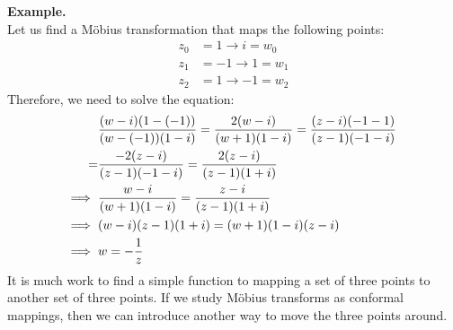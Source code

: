 \documentclass[11pt]{article}
\begin{document}
\textbf{Example.} \\
Let us find a Möbius transformation that maps the following points: 
\begin{align*}
z_0 &= 1 \to i = w_0 \\ 
z_1 &= -1 \to 1 = w_1 \\
z_2 &= 1 \to -1 = w_2 
\end{align*}
Therefore, we need to solve the equation:
\begin{align*}
&\frac{(w - i)(1 - (-1))}{(w - (-1))(1-i)} = \frac{2(w - i)}{(w + 1)(1 - i)} = \frac{(z - i)(-1-1)}{(z - 1)(-1 - i)} \\
= &\frac{-2(z - i)}{(z-1)(-1-i)} = \frac{2(z-i)}{(z-1)(1+i)}\\
\Longrightarrow \hspace{2mm}&\frac{w - i}{(w +1)(1 -i )} = \frac{z - i}{(z - 1)(1 + i)} \\
\Longrightarrow \hspace{2mm}&(w - i)(z - 1)(1 + i) = (w + 1)(1 - i)(z - i) \\
\Longrightarrow \hspace{2mm}&w = -\frac{1}{z}
\end{align*}
It is much work to find a simple function to mapping a set of three points to another set of three points. If we study Möbius transforms as conformal mappings, then we can introduce another way to move the three points around. 
\end{document}
